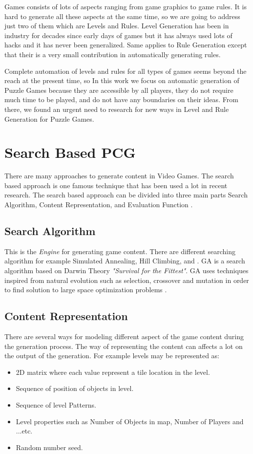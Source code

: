 Games consists of lots of aspects ranging from game graphics to game rules. It is hard to generate all these aspects at the same time, so we are going to address just two of them which are Levels and Rules. Level Generation has been in industry for decades since early days of games \cite{pcgFirstGame} but it has always used lots of hacks and it has never been generalized. Same applies to Rule Generation except that their is a very small contribution in automatically generating rules.\\\par

Complete automation of levels and rules for all types of games seems beyond the reach at the present time, so In this work we focus on automatic generation of Puzzle Games because they are accessible by all players, they do not require much time to be played, and do not have any boundaries on their ideas. From there, we found an urgent need to research for new ways in Level and Rule Generation for Puzzle Games.
 
\section{Search Based PCG}
There are many approaches to generate content in Video Games. The search based approach is one famous technique that has been used a lot in recent research. The search based approach can be divided into three main parts Search Algorithm, Content Representation, and Evaluation Function \cite{pcgBookSearch}.
\subsection{Search Algorithm}
This is the \emph{Engine} for generating game content. There are different searching algorithm for example Simulated Annealing, Hill Climbing, and . GA is a search algorithm based on Darwin Theory \textit{"Survival for the Fittest"}. GA uses techniques inspired from natural evolution such as selection, crossover and mutation in order to find solution to large space optimization problems \cite{geneticAlgorithm}.
\subsection{Content Representation}
There are several ways for modeling different aspect of the game content during the generation process. The way of representing the content can affects a lot on the output of the generation. For example levels may be represented as:\cite{pcgBookSearch}
\begin{itemize}\itemsep0pt \parskip0pt 
	\item 2D matrix where each value represent a tile location in the level.
	\item Sequence of position of objects in level.
	\item Sequence of level Patterns.
	\item Level properties such as Number of Objects in map, Number of Players and ...etc.
	\item Random number seed.
\end{itemize}
